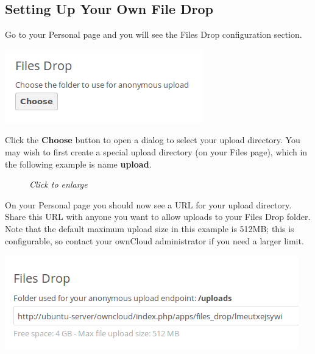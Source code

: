 \documentclass[letterpaper,10pt,english]{sphinxmanual}
\begin{document}
\subsection{Setting Up Your Own File Drop}
\label{files/file_drop:setting-up-your-own-file-drop}
Go to your Personal page and you will see the Files Drop configuration section.

\includegraphics{files-drop-2.png}

Click the \textbf{Choose} button to open a dialog to select your upload directory.
You may wish to first create a special upload directory (on your Files page),
which in the following example is name \textbf{upload}.
\begin{figure}[htbp]
\centering
\capstart

\caption{\emph{Click to enlarge}}\end{figure}

On your Personal page you should now see a URL for your upload directory. Share
this URL with anyone you want to allow uploads to your Files Drop folder. Note
that the default maximum upload size in this example is 512MB; this is
configurable, so contact your ownCloud administrator if you need a larger
limit.

\includegraphics{files-drop-4.png}
\end{document}
